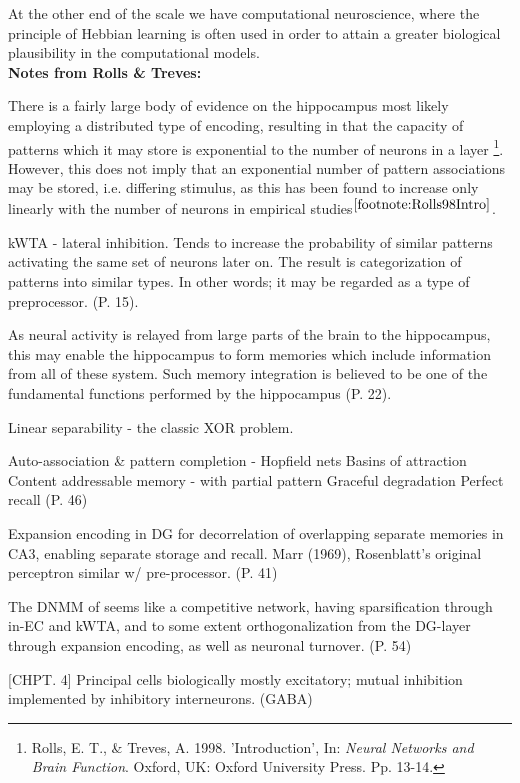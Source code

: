 At the other end of the scale we have computational neuroscience,  where the principle of Hebbian learning is often used in order to attain a greater biological plausibility in the computational models.
\\

\textbf{Notes from Rolls \& Treves:}

There is a fairly large body of evidence on the hippocampus most likely employing a distributed type of encoding, resulting in that the capacity of patterns which it may store is exponential to the number of neurons in a layer
\footnote{\label{footnote:Rolls98Intro}Rolls, E. T., \& Treves, A. 1998. 'Introduction', In: \textit{Neural Networks and Brain Function}. Oxford, UK: Oxford University Press. Pp. 13-14.}.
However, this does not imply that an exponential number of pattern associations may be stored, i.e. differing stimulus, as this has been found to increase only linearly with the number of neurons in empirical studies$^{\ref{footnote:Rolls98Intro}}$.

kWTA - lateral inhibition. Tends to increase the probability of similar patterns activating the same set of neurons later on. The result is categorization of patterns into similar types. In other words; it may be regarded as a type of preprocessor. (P. 15).

As neural activity is relayed from large parts of the brain to the hippocampus, this may enable the hippocampus to form memories which include information from all of these system. Such memory integration is believed to be one of the fundamental functions performed by the hippocampus (P. 22).

Linear separability - the classic XOR problem.

Auto-association \& pattern completion - Hopfield nets
Basins of attraction
Content addressable memory - with partial pattern
Graceful degradation
Perfect recall (P. 46)

Expansion encoding in DG for decorrelation of overlapping separate memories in CA3, enabling separate storage and recall. Marr (1969), Rosenblatt's original perceptron similar w/ pre-processor. (P. 41)

The DNMM of \cite{Hattori2014} seems like a competitive network, having sparsification through in-EC and kWTA, and to some extent orthogonalization from the DG-layer through expansion encoding, as well as neuronal turnover. (P. 54)

[CHPT. 4]
Principal cells biologically mostly excitatory; mutual inhibition implemented by inhibitory interneurons. (GABA)

